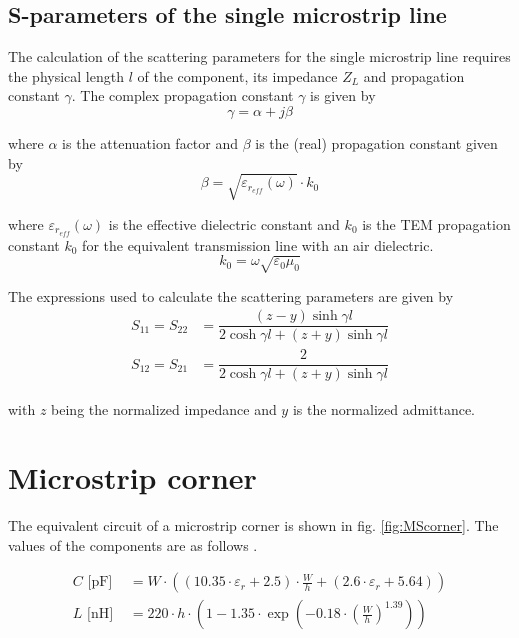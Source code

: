 \documentclass[10pt]{report}
\begin{document}
\subsection{S-parameters of the single microstrip line}

The calculation of the scattering parameters for the single microstrip
line requires the physical length $l$ of the component, its impedance
$Z_L$ and propagation constant $\gamma$.  The complex propagation
constant $\gamma$ is given by
\begin{equation}
\gamma = \alpha + j\beta
\end{equation}

where $\alpha$ is the attenuation factor and $\beta$ is the (real)
propagation constant given by
\begin{equation}
\beta = \sqrt{\varepsilon_{r_{eff}}(\omega)} \cdot k_0
\end{equation}

where $\varepsilon_{r_{eff}}(\omega)$ is the effective dielectric
constant and $k_0$ is the TEM propagation constant $k_0$ for the
equivalent transmission line with an air dielectric.
\begin{equation}
k_0 = \omega \sqrt{\varepsilon_0 \mu_0}
\end{equation}

The expressions used to calculate the scattering parameters are given
by
\begin{align}
S_{11} = S_{22} &= \dfrac{\left(z - y\right) \sinh{\gamma l}}{2\cosh{\gamma l} + \left(z + y\right) \sinh{\gamma l}}\\
S_{12} = S_{21} &= \dfrac{2}{2\cosh{\gamma l} + \left(z + y\right) \sinh{\gamma l}}
\end{align}

with $z$ being the normalized impedance and $y$ is the normalized
admittance.

\section{Microstrip corner}

The equivalent circuit of a microstrip corner is shown in fig.
\ref{fig:MScorner}.  The values of the components are as follows
\cite{Kirschning4}.

\begin{align}
C \text{ [pF] } &= W \cdot \left( (10.35\cdot\varepsilon_r + 2.5) \cdot \frac{W}{h} +
			       (2.6\cdot\varepsilon_r + 5.64) \right)\\
L \text{ [nH] } &= 220\cdot h \cdot \left( 1 - 1.35\cdot\exp\left( -0.18\cdot
		   \left( \frac{W}{h} \right)^{1.39} \right) \right)
\end{align}
\end{document}
